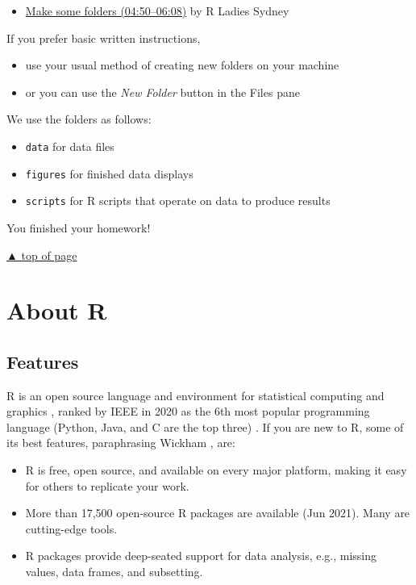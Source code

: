 \documentclass[
]{book}
\providecommand{\tightlist}{%
  \setlength{\itemsep}{0pt}\setlength{\parskip}{0pt}}
\begin{document}
\begin{itemize}
\tightlist
\item
  \href{https://www.youtube.com/embed/kfcX5DEMAp4?start=290\&end=368}{Make some folders (04:50--06:08)} by R Ladies Sydney \citep{RLadiesSydney:2018:Lesson1}
\end{itemize}

If you prefer basic written instructions,

\begin{itemize}
\tightlist
\item
  use your usual method of creating new folders on your machine
\item
  or you can use the \emph{New Folder} button in the Files pane
\end{itemize}

We use the folders as follows:

\begin{itemize}
\tightlist
\item
  \texttt{data} for data files
\item
  \texttt{figures} for finished data displays\\
\item
  \texttt{scripts} for R scripts that operate on data to produce results
\end{itemize}

You finished your homework!

\protect\hyperlink{install-everything}{▲ top of page}

\hypertarget{about-R}{%
\chapter{About R}\label{about-R}}

\hypertarget{features}{%
\section*{Features}\label{features}}

R is an open source language and environment for statistical computing and graphics \citep{R-base}, ranked by IEEE in 2020 as the 6th most popular programming language (Python, Java, and C are the top three) \citep{Cass:2020}. If you are new to R, some of its best features, paraphrasing Wickham \citeyearpar{wickham2014advanced}, are:

\begin{itemize}
\tightlist
\item
  R is free, open source, and available on every major platform, making it easy for others to replicate your work.
\item
  More than 17,500 open-source R packages are available (Jun 2021). Many are cutting-edge tools.
\item
  R packages provide deep-seated support for data analysis, e.g., missing values, data frames, and subsetting.
\end{itemize}
\end{document}
